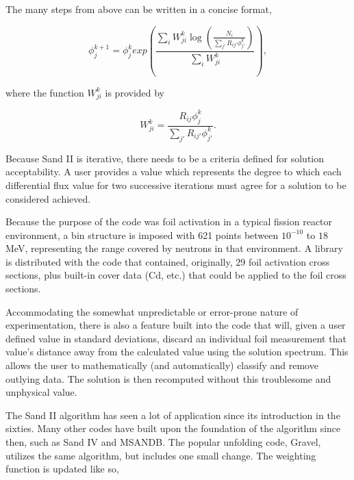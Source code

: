 The many steps from above can be written in a concise format,

\begin{equation}
\label{eqn:sandii}
\phi_j^{k + 1} = \phi_j^{k} exp(\frac{\sum_i W_{ji}^k \log(\frac{N_i}{\sum_{j'} R_{ij'} \phi_{j'}^k})}{\sum_i W_{ji}^k}) ,
\end{equation}

\noindent
where the function $W_{ji}^k$ is provided by

\begin{equation}
\label{eqn:sandii-w}
W_{ji}^k = \frac{R_{ij} \phi_{j}^k}{\sum_{j'} R_{ij'} \phi_{j'}^k} .
\end{equation}

Because Sand II is iterative, there needs to be a criteria defined for solution acceptability.
A user provides a value which represents the degree to which each differential flux value for two successive iterations must agree for a solution to be considered achieved.

Because the purpose of the code was foil activation in a typical fission reactor environment, a bin structure is imposed with 621 points between $10^{-10}$ to $18$ MeV, representing the range covered by neutrons in that environment.
A library is distributed with the code that contained, originally, 29 foil activation cross sections, plus built-in cover data (Cd, etc.) that could be applied to the foil cross sections.

Accommodating the somewhat unpredictable or error-prone nature of experimentation, there is also a feature built into the code that will, given a user defined value in standard deviations, discard an individual foil measurement that value's distance away from the calculated value using the solution spectrum.
This allows the user to mathematically (and automatically) classify and remove outlying data.
The solution is then recomputed without this troublesome and unphysical value.

The Sand II algorithm has seen a lot of application since its introduction in the sixties.
Many other codes have built upon the foundation of the algorithm since then, such as Sand IV and MSANDB.
The popular unfolding code, Gravel, utilizes the same algorithm, but includes one small change.
The weighting function is updated like so,

